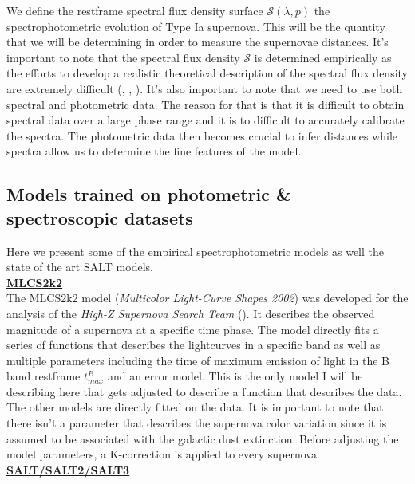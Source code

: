 We define the restframe spectral flux density surface $\mathcal{S}(\lambda, p)$ the spectrophotometric evolution of Type Ia supernova. This will be the quantity that we will
be determining in order to measure the supernovae distances. It's important to note that the spectral flux density $\mathcal{S}$ is determined empirically as the efforts to develop a realistic theoretical 
description of the spectral flux density are extremely difficult (\cite{Blinnikov_2006_difficult_theory}, \cite{R_pke_2018_difficult_theory},  
\cite{Pakmor_2024_difficult_theory}). It's also important to note that we need to use both spectral and photometric data. 
The reason for that is that it is difficult to obtain spectral data over a large phase range and it is to difficult to accurately calibrate the spectra. 
The photometric data then becomes crucial to infer distances while spectra allow us to determine the fine features of the model.\\


\subsection{Models trained on photometric \& spectroscopic datasets}

Here we present some of the empirical spectrophotometric models as well the state of the art SALT models.\\

\noindent \textbf{\underline{MLCS2k2}} \\

The MLCS2k2 model (\textit{Multicolor Light-Curve Shapes 2002}) was 
developed for the analysis of the \textit{High-Z Supernova Search Team} (\cite{Riess_1996}). It describes the observed magnitude of a supernova at a 
specific time phase. The model directly fits a series of functions that describes the lightcurves in a specific band as well as multiple parameters 
including the time of maximum emission of light in the B band restframe $ t_{max}^B$ and an error model. This is the only model I will be
describing here that gets adjusted to describe a function that describes the data. The other models are directly fitted
on the data. It is important to note that there isn't a parameter that describes the supernova color variation since it is assumed 
to be associated with the galactic dust extinction. Before adjusting the 
model parameters, a K-correction is applied to every supernova. \\

\noindent \textbf{\underline{SALT/SALT2/SALT3}} \\


